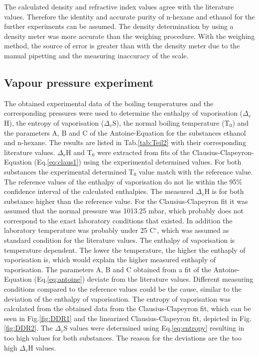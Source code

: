 \documentclass[a4paper,abstracton]{article}	                       %
\renewcommand{\cite}{\supercite}						%
\begin{document}
The calculated density and refractive index values agree with the literature values. Therefore the identity and accurate purity of n-hexane and ethanol for the further experiments can be assumed. The density determination by using a density meter was more accurate than the weighing procedure. With the weighing method, the source of error is greater than with the density meter due to the manual pipetting and the measuring inaccuracy of the scale. 

\subsection*{Vapour pressure experiment}
The obtained experimental data of the boiling temperatures and the corresponding pressures were used to determine the enthalpy of vaporisation ($\Delta_{\textit{v}}$H), the entropy of vaporisation ($\Delta_{\textit{v}}$S), the normal boiling temperature (T$_{0}$) and the parameters A, B and C of the Antoine-Equation for the substances ethanol and n-hexane. The results are listed in Tab.\ref{tab:Teil2} with their corresponding literature values. $\Delta_{\textit{v}}$H and T$_{0}$ were extracted from fits of the Clausius-Clapeyron-Equation (Eq.\ref{eq:claus1}) using the experimental determined values. For both substances the experimental determined T$_{0}$ value match with the reference value. The reference values of the enthalpy of vaporisation do not lie within the 95\% confidence interval of the calculated enthalpies. The measured $\Delta_{\textit{v}}$H is for both substance higher than the reference value. For the Clausius-Clapeyron fit it was assumed that the normal pressure was 1013.25 mbar, which probably does not correspond to the exact laboratory conditions that existed. In addition the laboratory temperature was probably under 25 C$^{\circ}$, which was assumed as standard condition for the literature values\cite{reference}. The enthalpy of vaporisation is temperature dependent\cite{enthalpieT}. The lower the temperature, the higher the enthaply of vaporisation is, which would explain the higher measured enthaply of vaporisation. The parameters A, B and C obtained from a fit of the Antoine-Equation (Eq.\ref{eq:antoine}) deviate from the literature values. Different measuring conditions compared to the reference values could be the cause, similar to the deviation of the enthalpy of vaporisation. The entropy of vaporisation was calculated from the obtained data from the Clausius-Clapeyron fit, which can be seen in Fig.\ref{fig:DDR1} and the linearized Clausius-Clapeyron fit, depicted in Fig.\ref{fig:DDR2}. The $\Delta_{\textit{v}}$S values were determined using Eq.\ref{eq:entropy} resulting in too high values for both substances. The reason for the deviations are the too high $\Delta_{\textit{v}}$H values. 
\end{document}
